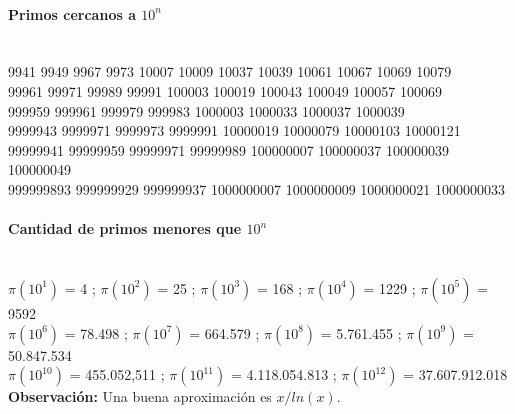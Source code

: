 \paragraph{Primos cercanos a $10^n$}\ \\
9941 9949 9967 9973 10007 10009 10037 10039 10061 10067 10069 10079\\
99961 99971 99989 99991 100003 100019 100043 100049 100057 100069\\
999959 999961 999979 999983 1000003 1000033 1000037 1000039\\
9999943 9999971 9999973 9999991 10000019 10000079 10000103 10000121\\
99999941 99999959 99999971 99999989 100000007 100000037 100000039 100000049\\
999999893 999999929 999999937 1000000007 1000000009 1000000021 1000000033
 
\paragraph{Cantidad de primos menores que $10^n$}\ \\
$\pi(10^1)$ = 4 ;
$\pi(10^2)$ = 25 ;
$\pi(10^3)$ = 168 ;
$\pi(10^4)$ = 1229 ;
$\pi(10^5)$ = 9592 \\
$\pi(10^6)$ = 78.498 ;
$\pi(10^7)$ = 664.579 ;
$\pi(10^8)$ = 5.761.455 ;
$\pi(10^9)$ = 50.847.534 \\
$\pi(10^{10})$ = 455.052,511 ;
$\pi(10^{11})$ = 4.118.054.813 ;
$\pi(10^{12})$ = 37.607.912.018 \\
\textbf{Observación:} Una buena aproximación es $x/ln(x)$.
%
%
%
